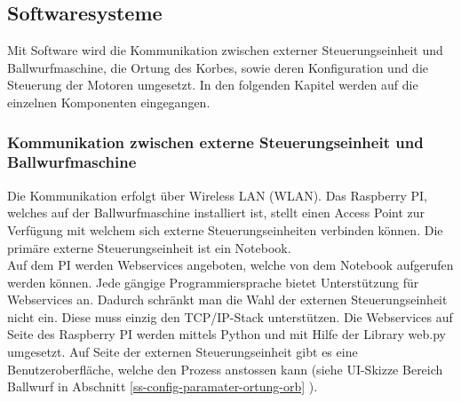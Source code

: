 \subsection{Softwaresysteme}
Mit Software wird die Kommunikation zwischen externer Steuerungseinheit und Ballwurfmaschine, die Ortung des Korbes, sowie deren Konfiguration und die Steuerung der Motoren umgesetzt. In den folgenden Kapitel werden auf die einzelnen Komponenten eingegangen.

\subsubsection{Kommunikation zwischen externe Steuerungseinheit und Ballwurfmaschine}
Die Kommunikation erfolgt über Wireless LAN (WLAN). Das Raspberry PI, welches auf der Ballwurfmaschine installiert ist, stellt einen Access Point zur Verfügung mit welchem sich externe Steuerungseinheiten verbinden können. Die primäre externe Steuerungseinheit ist ein Notebook.\\
Auf dem PI werden Webservices angeboten, welche von dem Notebook aufgerufen werden können. Jede gängige Programmiersprache bietet Unterstützung für Webservices an. Dadurch schränkt man die Wahl der externen Steuerungseinheit nicht ein. Diese muss einzig den TCP/IP-Stack unterstützen. Die Webservices auf Seite des Raspberry PI werden mittels Python und mit Hilfe der Library web.py umgesetzt. Auf Seite der externen Steuerungseinheit gibt es eine Benutzeroberfläche, welche den Prozess anstossen kann (siehe UI-Skizze Bereich Ballwurf in Abschnitt \ref{ss-config-paramater-ortung-orb} ).

